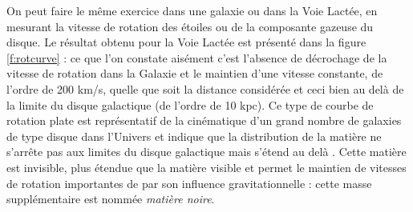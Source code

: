 On peut faire le même exercice dans une galaxie ou dans la Voie Lactée, en mesurant la vitesse de rotation des étoiles ou de la composante gazeuse du disque. Le résultat obtenu pour la Voie Lactée est présenté dans la figure \ref{f:rotcurve} : ce que l'on constate aisément c'est l'absence de décrochage de la vitesse de rotation dans la Galaxie et le maintien d'une vitesse constante, de l'ordre de 200 km/s, quelle que soit la distance considérée et ceci bien au delà de la limite du disque galactique (de l'ordre de 10 kpc). Ce type de courbe de rotation plate est représentatif de la cinématique d'un grand nombre de galaxies de type disque dans l'Univers et indique que la distribution de la matière ne s'arrête pas aux limites du disque galactique mais s'étend au delà . Cette matière est invisible, plus étendue que la matière visible et permet le maintien de vitesses de rotation importantes de par son influence gravitationnelle : cette masse supplémentaire est nommée \textit{matière noire}.

